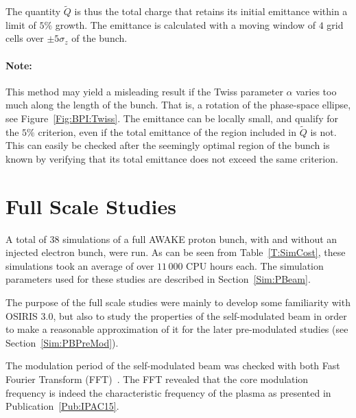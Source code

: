 The quantity $\tilde{Q}$ is thus the total charge that retains its initial emittance within a limit of $5\%$ growth.
The emittance is calculated with a moving window of $4$ grid cells over $\pm 5\sigma_z$ of the bunch.

\paragraph{Note:} This method may yield a misleading result if the Twiss parameter $\alpha$ varies too much along the length of the bunch.
That is, a rotation of the phase-space ellipse, see Figure~\ref{Fig:BPI:Twiss}.
The emittance can be locally small, and qualify for the $5\%$ criterion, even if the total emittance of the region included in $\tilde{Q}$ is not.
This can easily be checked after the seemingly optimal region of the bunch is known by verifying that its total emittance does not exceed the same criterion.

\section{Full Scale Studies}
\label{SimA:FullScale}

A total of 38 simulations of a full AWAKE proton bunch, with and without an injected electron bunch, were run.
As can be seen from Table~\ref{T:SimCost}, these simulations took an average of over $11\,000$ CPU hours each.
The simulation parameters used for these studies are described in Section~\ref{Sim:PBeam}.

The purpose of the full scale studies were mainly to develop some familiarity with OSIRIS 3.0, but also to study the properties of the self-modulated beam in order to make a reasonable approximation of it for the later pre-modulated studies (see Section~\ref{Sim:PBPreMod}).

The modulation period of the self-modulated beam was checked with both Fast Fourier Transform (FFT)~\cite{van_loan:1992}.
The FFT revealed that the core modulation frequency is indeed the characteristic frequency of the plasma as presented in Publication~\ref{Pub:IPAC15}.

